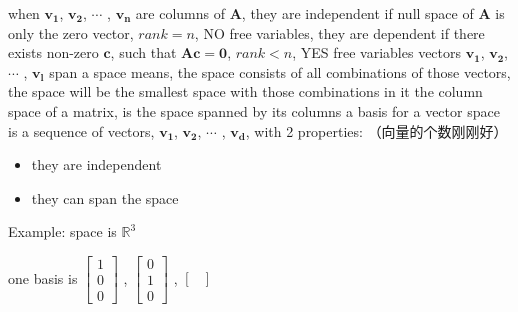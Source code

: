 \documentclass[12pt, a4paper]{article}
\begin{document}
{\begin{itemize}
\end{itemize}
\vspace{14pt}
when ${\mathbf{v_1}}$, ${\mathbf{v_2}}$, $\cdots$ , ${\mathbf{v_n}}$ are columns of ${\mathbf{A}}$,
\newline
they are independent if null space of ${\mathbf{A}}$ is only the zero vector, $rank=n$, NO free variables,
\newline
they are dependent if there exists non-zero ${\mathbf{c}}$, such that ${\mathbf{A}}{\mathbf{c}}={\mathbf{0}}$, $rank<n$, YES free variables
\vspace{14pt}
\newline
vectors ${\mathbf{v_1}}$, ${\mathbf{v_2}}$, $\cdots$ , ${\mathbf{v_l}}$ span a space means,
\newline
the space consists of all combinations of those vectors,
\newline
the space will be the smallest space with those combinations in it
\vspace{14pt}
\newline
the column space of a matrix, is the space spanned by its columns
\vspace{14pt}
\newline
a basis for a vector space is a sequence of vectors, ${\mathbf{v_1}}$, ${\mathbf{v_2}}$, $\cdots$ , ${\mathbf{v_d}}$, with 2 properties:
\newline
{\textcolor{anhao-scarlet}{（向量的个数刚刚好）}}
\begin{itemize}
	\item they are independent
	\item they can span the space
\end{itemize}
\vspace{14pt}
Example: space is $\mathbb{R}^3$
\par one basis is 
\begin{math}
	\begin{bmatrix}
		1 \\
		0 \\
		0 
	\end{bmatrix}
\end{math}
, 
\begin{math}
	\begin{bmatrix}
		0 \\
		1 \\
		0 
	\end{bmatrix}
\end{math}
, 
\begin{math}
	\begin{bmatrix}

\end{bmatrix}
\end{math}}
\end{document}
